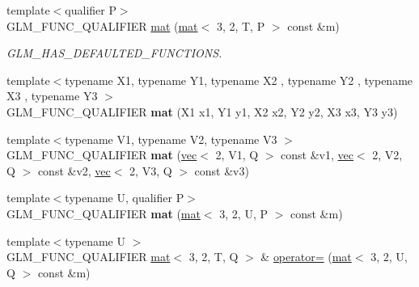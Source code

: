 \begin{DoxyCompactItemize}
{\footnotesize template$<$qualifier P$>$ }\\G\+L\+M\+\_\+\+F\+U\+N\+C\+\_\+\+Q\+U\+A\+L\+I\+F\+I\+ER \hyperlink{structglm_1_1mat_3_013_00_012_00_01T_00_01Q_01_4_a7fad252d28aa648a3e6ece0109edcbe3}{mat} (\hyperlink{structglm_1_1mat}{mat}$<$ 3, 2, T, P $>$ const \&m)
\begin{DoxyCompactList}\small\item\em G\+L\+M\+\_\+\+H\+A\+S\+\_\+\+D\+E\+F\+A\+U\+L\+T\+E\+D\+\_\+\+F\+U\+N\+C\+T\+I\+O\+NS. \end{DoxyCompactList}\item 
\mbox{\label{structglm_1_1mat_3_013_00_012_00_01T_00_01Q_01_4_af16c6d8cb3a1cd36056e75f9e23625fd}} 
{\footnotesize template$<$typename X1, typename Y1, typename X2 , typename Y2 , typename X3 , typename Y3 $>$ }\\G\+L\+M\+\_\+\+F\+U\+N\+C\+\_\+\+Q\+U\+A\+L\+I\+F\+I\+ER {\bfseries mat} (X1 x1, Y1 y1, X2 x2, Y2 y2, X3 x3, Y3 y3)
\item 
\mbox{\label{structglm_1_1mat_3_013_00_012_00_01T_00_01Q_01_4_a4232f38b6240e3182355f3d576b64a3b}} 
{\footnotesize template$<$typename V1, typename V2, typename V3 $>$ }\\G\+L\+M\+\_\+\+F\+U\+N\+C\+\_\+\+Q\+U\+A\+L\+I\+F\+I\+ER {\bfseries mat} (\hyperlink{structglm_1_1vec}{vec}$<$ 2, V1, Q $>$ const \&v1, \hyperlink{structglm_1_1vec}{vec}$<$ 2, V2, Q $>$ const \&v2, \hyperlink{structglm_1_1vec}{vec}$<$ 2, V3, Q $>$ const \&v3)
\item 
\mbox{\label{structglm_1_1mat_3_013_00_012_00_01T_00_01Q_01_4_a8e963ea72c1c43338d282eb3e8563155}} 
{\footnotesize template$<$typename U, qualifier P$>$ }\\G\+L\+M\+\_\+\+F\+U\+N\+C\+\_\+\+Q\+U\+A\+L\+I\+F\+I\+ER {\bfseries mat} (\hyperlink{structglm_1_1mat}{mat}$<$ 3, 2, U, P $>$ const \&m)
\item 
\mbox{\label{structglm_1_1mat_3_013_00_012_00_01T_00_01Q_01_4_a3039957df4d73284af2826670a4d2d2d}} 
{\footnotesize template$<$typename U $>$ }\\G\+L\+M\+\_\+\+F\+U\+N\+C\+\_\+\+Q\+U\+A\+L\+I\+F\+I\+ER \hyperlink{structglm_1_1mat}{mat}$<$ 3, 2, T, Q $>$ \& \hyperlink{structglm_1_1mat_3_013_00_012_00_01T_00_01Q_01_4_a3039957df4d73284af2826670a4d2d2d}{operator=} (\hyperlink{structglm_1_1mat}{mat}$<$ 3, 2, U, Q $>$ const \&m)

\end{DoxyCompactItemize}
